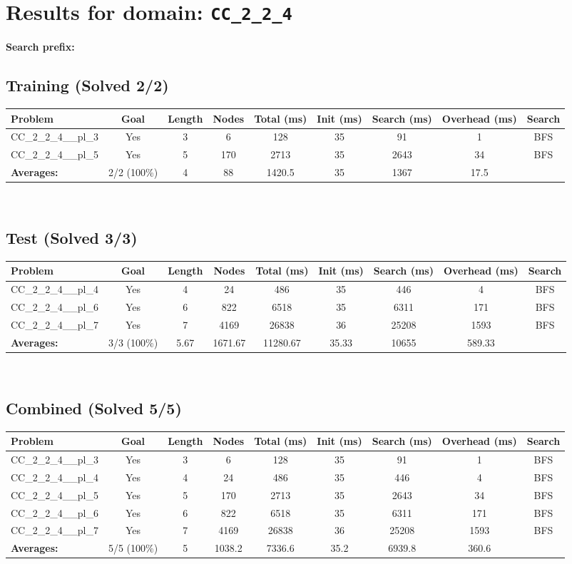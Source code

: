 \documentclass{article}
\begin{document}
\section*{Results for domain: \texttt{CC\_2\_2\_4}}
\textbf{Search prefix:} 
\\[0.5cm]
\subsection*{Training (Solved 2/2)}
\begin{tabular}{lcccccccc}
\toprule
Problem & Goal & Length & Nodes & Total (ms) & Init (ms) & Search (ms) & Overhead (ms) & Search \\
\midrule
CC\_2\_2\_4\_\_pl\_3 & Yes & 3 & 6 & 128 & 35 & 91 & 1 & BFS \\
CC\_2\_2\_4\_\_pl\_5 & Yes & 5 & 170 & 2713 & 35 & 2643 & 34 & BFS \\
\textbf{Averages:} & 2/2 (100\%) & 4 & 88 & 1420.5 & 35 & 1367 & 17.5 & \\
\bottomrule
\end{tabular}
\\[0.7cm]
\subsection*{Test (Solved 3/3)}
\begin{tabular}{lcccccccc}
\toprule
Problem & Goal & Length & Nodes & Total (ms) & Init (ms) & Search (ms) & Overhead (ms) & Search \\
\midrule
CC\_2\_2\_4\_\_pl\_4 & Yes & 4 & 24 & 486 & 35 & 446 & 4 & BFS \\
CC\_2\_2\_4\_\_pl\_6 & Yes & 6 & 822 & 6518 & 35 & 6311 & 171 & BFS \\
CC\_2\_2\_4\_\_pl\_7 & Yes & 7 & 4169 & 26838 & 36 & 25208 & 1593 & BFS \\
\textbf{Averages:} & 3/3 (100\%) & 5.67 & 1671.67 & 11280.67 & 35.33 & 10655 & 589.33 & \\
\bottomrule
\end{tabular}
\\[0.7cm]
\subsection*{Combined (Solved 5/5)}
\begin{tabular}{lcccccccc}
\toprule
Problem & Goal & Length & Nodes & Total (ms) & Init (ms) & Search (ms) & Overhead (ms) & Search \\
\midrule
CC\_2\_2\_4\_\_pl\_3 & Yes & 3 & 6 & 128 & 35 & 91 & 1 & BFS \\
CC\_2\_2\_4\_\_pl\_4 & Yes & 4 & 24 & 486 & 35 & 446 & 4 & BFS \\
CC\_2\_2\_4\_\_pl\_5 & Yes & 5 & 170 & 2713 & 35 & 2643 & 34 & BFS \\
CC\_2\_2\_4\_\_pl\_6 & Yes & 6 & 822 & 6518 & 35 & 6311 & 171 & BFS \\
CC\_2\_2\_4\_\_pl\_7 & Yes & 7 & 4169 & 26838 & 36 & 25208 & 1593 & BFS \\
\textbf{Averages:} & 5/5 (100\%) & 5 & 1038.2 & 7336.6 & 35.2 & 6939.8 & 360.6 & \\
\bottomrule
\end{tabular}
\\[0.7cm]
\end{document}
